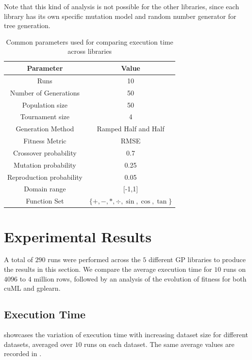 Note that this kind of analysis is not possible for the other libraries, since each library has its own specific mutation model and random number generator for tree generation. 

\begin{table}[htbp]
  \caption{Common parameters used for comparing execution time across libraries}
  \begin{center}
    \begin{tabular}[c]{cc}
      \toprule
      \textbf{Parameter} & \textbf{Value} \\
      \midrule
      Runs                      & 10      \\
      Number of Generations     & 50      \\
      Population size           & 50      \\
      Tournament size           & 4       \\ 
      Generation Method         & Ramped Half and Half \\
      Fitness Metric            & RMSE    \\
      Crossover probability     & 0.7     \\
      Mutation probability      & 0.25    \\
      Reproduction probability  & 0.05    \\
      Domain range              & [-1,1]  \\
      Function Set              & $\{+,-,*,\div,\sin ,\cos,\tan\}$ \\
      \bottomrule
    \end{tabular}
    \label{tab:params}
  \end{center}
\end{table}

\section{Experimental Results}
\label{sec:results}
A total of $290$ runs were performed across the $5$ different GP libraries to produce the results in this section. We compare the average execution time for $10$ runs on $4096$ to $4$ million rows, followed by an analysis of the evolution of fitness for both cuML and gplearn.

\subsection{Execution Time}
\label{subsec:exectimes}
 showcases the variation of execution time with increasing dataset size for different datasets, averaged over $10$ runs on each dataset. The same average values are recorded in .

